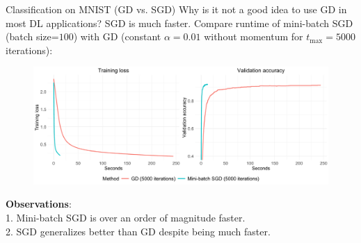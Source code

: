 \documentclass[11pt,compress,t,notes=noshow, xcolor=table]{beamer}
\begin{document}
\begin{vbframe}{Classification on MNIST (GD vs. SGD)}
\vspace{-0.2cm}
Why is it not a good idea to use GD in most DL applications? SGD is much faster. Compare runtime of mini-batch SGD (batch size=$100$) with GD (constant $\alpha=0.01$ without momentum for $t_{\text{max}}=5000$ iterations):
\begin{figure}
            \includegraphics[width=1.0\textwidth]{slides/04-multivariate-first-order/figure_man/simu_mnist/SGD_GD_compar.pdf} \\
\end{figure} 
\textbf{Observations}:\\ 1. Mini-batch SGD is over an order of magnitude faster.\\
2. SGD generalizes better than GD despite being much faster. \\
\end{vbframe}



\endlecture
\end{document}
